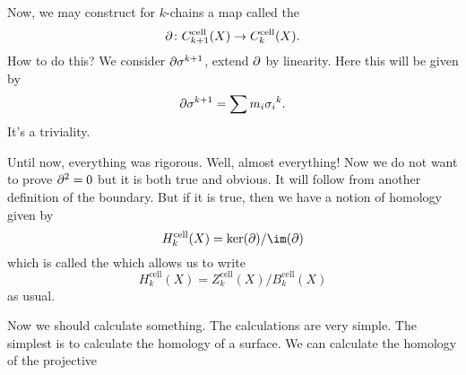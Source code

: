 Now, we may construct for $k$-chains a map called the
\begin{equation}
\partial\colon C^{\text{cell}}_{k+1}(X)\to C^{\text{cell}}_{k}(X).
\end{equation}
How to do this? We consider $\partial\sigma^{k+1}$, extend
$\partial$ by linearity. Here this will be given by
\begin{equation}
\partial\sigma^{k+1}=\sum m_{i}{\sigma_{i}}^{k}.
\end{equation}
It's a triviality.

Until now, everything was rigorous. Well, almost everything! Now
we do not want to prove $\partial^2=0$ but it is both true and obvious.
It will follow from another definition of the boundary. But if it
is true, then we have a notion of homology given by
\begin{equation}
H^{\text{cell}}_{k}(X) = \ker(\bdry)/\im(\bdry)
\end{equation}
which is called the 
 which allows us to write
\begin{equation}
H^{\text{cell}}_{k}(X)=Z^{\text{cell}}_{k}(X)/B^{\text{cell}}_{k}(X)
\end{equation}
as usual.

Now we should calculate something. The calculations are very
simple. The simplest is to calculate the homology of a
surface. We can calculate the homology of the projective 

